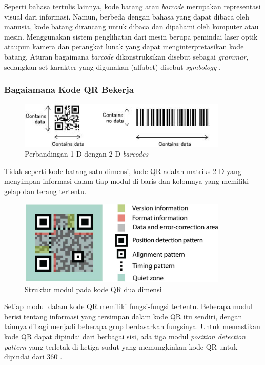 Seperti bahasa tertulis lainnya, kode batang atau \emph{barcode} merupakan representasi visual dari informasi. Namun, berbeda dengan bahasa yang dapat dibaca
oleh manusia, kode batang dirancang untuk dibaca dan dipahami oleh komputer atau mesin. Menggunakan sistem penglihatan dari mesin berupa pemindai laser optik
ataupun kamera dan perangkat lunak yang dapat menginterpretasikan kode batang. Aturan bagaimana \emph{barcode} dikonstruksikan disebut sebagai \emph{grammar},
sedangkan set karakter yang digunakan (alfabet) disebut \emph{symbology} \cite{densoqrcode}.

\subsubsection{Bagaiamana Kode QR Bekerja}
\begin{figure}[h]
	\centering
	\includegraphics[width=10cm]{contents/chapter-2/2-2dvs1dcode.jpg}
	\caption{Perbandingan 1-D dengan 2-D \emph{barcodes}}
	\label{Fig: 2-2dvs1dcode}
\end{figure}

Tidak seperti kode batang satu dimensi, kode QR adalah matriks 2-D yang menyimpan informasi dalam tiap modul di baris dan kolomnya yang memiliki gelap dan
terang tertentu.

\begin{figure}[h]
	\centering
	\includegraphics[width=10cm]{contents/chapter-2/2-strukturqrasli.jpg}
	\caption{Struktur modul pada kode QR dua dimensi}
	\label{Fig: 2-strukturqrasli}
\end{figure}

Setiap modul dalam kode QR memiliki fungsi-fungsi tertentu. Beberapa modul berisi tentang informasi yang tersimpan dalam kode QR itu sendiri, dengan lainnya
dibagi menjadi beberapa grup berdasarkan fungsinya. Untuk memastikan kode QR dapat dipindai dari berbagai sisi, ada tiga modul \emph{position detection
	pattern} yang terletak di ketiga sudut yang memungkinkan kode QR untuk dipindai dari 360$^{\circ}$.

